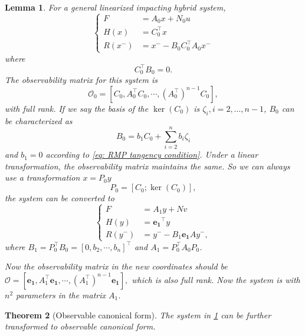 \documentclass{article}
\newtheorem{theorem}{Theorem}[section]
\newtheorem{lemma}[theorem]{Lemma}
\begin{document}
\begin{lemma}
	For a general linearized impacting hybrid system, 
	\begin{equation}
		\begin{cases}
			F  &= A_0 x + N_0 u \\
			H(x) &= C_0^{\top}x  \\
			R(x^-) &= x^- - B_0 C_0^{\top} A_0 x^-
		\end{cases}
	\end{equation}
where 
\begin{equation}
	C_0^{\top} B_0 =0.
	\label{eq: RMP tangency condition}
\end{equation}
The observability matrix for this system is 
\begin{equation}
	\mathcal{O}_0 = [C_0, A_0^{\top} C_0, \cdots , (A_0^{\top})^{n-1}C_0],
\end{equation}
with full rank.
%
If we say the basis of the $\operatorname{ker}(C_0)$ is $\zeta_i, i = 2,\dots,n-1$, $B_0$ can be characterized  as 
\[
 B_0  = b_1  C_0 + \sum_{i=2}^{n} b_i \zeta_i
\]
and $b_1=0$ according to \ref{eq: RMP tangency condition}.
Under a linear transformation, the observability matrix maintains the same. So we can always use a transformation $x = P_0 y$
\[
 P_0 = [C_0; \operatorname{ker}(C_0)],
\]
the system can be converted to 
\begin{equation}
	\begin{cases}
		F  &= A_1 y + N v  \\
		H(y) &= \mathbf{e_1}^{\top} y \\
		 R(y^-) &= y^- - B_1 \mathbf{e_1} A y^- ,
	\end{cases}
\end{equation}
where $B_1 = P_0^{\top} B_0 = [0,b_2, \cdots, b_n]^{\top}$ and $A_1 = P_0^{\top} A_0 P_0$.

Now the observability matrix in the new coordinates should be 
$\mathcal{O} = [\mathbf{e_1}, A_1^{\top}\mathbf{e_1}, \cdots , (A_1^{\top})^{n-1}\mathbf{e_1}],$ which is also full rank.
Now the system is with $n^2$ parameters in the matrix $A_1$.

\label{lemma: observable system in stabdard basis}
\end{lemma}

\begin{theorem}[Observable canonical form]
	The system in \ref{lemma: observable system in stabdard basis} can be further transformed to observable canonical form.
	\label{th:OB_form_trans}
\end{theorem}
\end{document}
